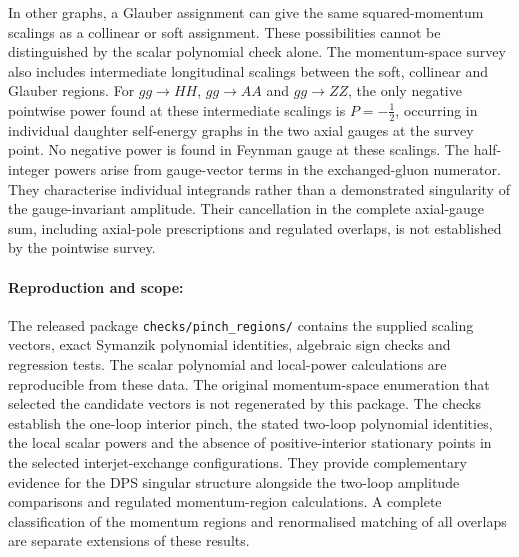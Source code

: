 In other graphs, a Glauber
assignment can give the same
squared-momentum scalings as a
collinear or soft assignment.
These possibilities cannot be
distinguished by the scalar
polynomial check alone.
%
The momentum-space survey also
includes intermediate longitudinal
scalings between the soft,
collinear and Glauber regions.
For $gg\to HH$, $gg\to AA$
and $gg\to ZZ$, the only
negative pointwise power found
at these intermediate scalings
is $P=-\tfrac12$, occurring
in individual daughter
self-energy graphs in the
two axial gauges at the survey point.
No negative power is found
in Feynman gauge at these
scalings.
%
The half-integer powers arise
from gauge-vector terms in
the exchanged-gluon numerator.
They characterise individual
integrands rather than a
demonstrated singularity of
the gauge-invariant amplitude.
Their cancellation in the
complete axial-gauge sum,
including axial-pole
prescriptions and regulated
overlaps, is not established
by the pointwise survey.

\paragraph{Reproduction and scope: }
The released package
\texttt{checks/pinch\_regions/}
contains the supplied scaling
vectors, exact Symanzik
polynomial identities, algebraic
sign checks and regression tests.
%
The scalar polynomial and
local-power calculations are
reproducible from these data.
The original momentum-space
enumeration that selected the
candidate vectors is not
regenerated by this package.
%
The checks establish the
one-loop interior pinch,
the stated two-loop polynomial
identities, the local scalar
powers and the absence of
positive-interior stationary
points in the selected
interjet-exchange configurations.
They provide complementary
evidence for the DPS singular
structure alongside the
two-loop amplitude comparisons
and regulated momentum-region
calculations.
%
A complete classification of
the momentum regions and
renormalised matching of
all overlaps are separate
extensions of these results.
